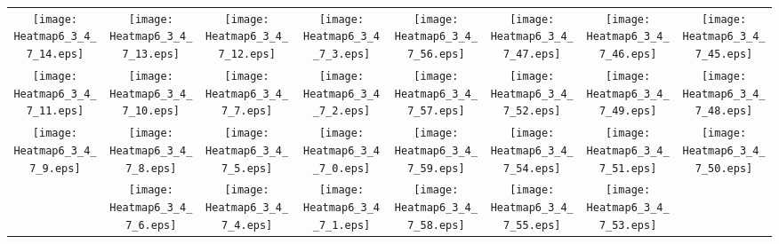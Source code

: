 \documentclass{standalone}
\begin{document}
\begin{tabular}{ *8{c} }
\texttt{[image: Heatmap6\_3\_4\_7\_14.eps]} & \texttt{[image: Heatmap6\_3\_4\_7\_13.eps]} & \texttt{[image: Heatmap6\_3\_4\_7\_12.eps]} & \texttt{[image: Heatmap6\_3\_4\_7\_3.eps]} & \texttt{[image: Heatmap6\_3\_4\_7\_56.eps]} & \texttt{[image: Heatmap6\_3\_4\_7\_47.eps]} & \texttt{[image: Heatmap6\_3\_4\_7\_46.eps]} & \texttt{[image: Heatmap6\_3\_4\_7\_45.eps]} \\
\texttt{[image: Heatmap6\_3\_4\_7\_11.eps]} & \texttt{[image: Heatmap6\_3\_4\_7\_10.eps]} & \texttt{[image: Heatmap6\_3\_4\_7\_7.eps]} & \texttt{[image: Heatmap6\_3\_4\_7\_2.eps]} & \texttt{[image: Heatmap6\_3\_4\_7\_57.eps]} & \texttt{[image: Heatmap6\_3\_4\_7\_52.eps]} & \texttt{[image: Heatmap6\_3\_4\_7\_49.eps]} & \texttt{[image: Heatmap6\_3\_4\_7\_48.eps]} \\
\texttt{[image: Heatmap6\_3\_4\_7\_9.eps]} & \texttt{[image: Heatmap6\_3\_4\_7\_8.eps]} & \texttt{[image: Heatmap6\_3\_4\_7\_5.eps]} & \texttt{[image: Heatmap6\_3\_4\_7\_0.eps]} & \texttt{[image: Heatmap6\_3\_4\_7\_59.eps]} & \texttt{[image: Heatmap6\_3\_4\_7\_54.eps]} & \texttt{[image: Heatmap6\_3\_4\_7\_51.eps]} & \texttt{[image: Heatmap6\_3\_4\_7\_50.eps]} \\
 & \texttt{[image: Heatmap6\_3\_4\_7\_6.eps]} & \texttt{[image: Heatmap6\_3\_4\_7\_4.eps]} & \texttt{[image: Heatmap6\_3\_4\_7\_1.eps]} & \texttt{[image: Heatmap6\_3\_4\_7\_58.eps]} & \texttt{[image: Heatmap6\_3\_4\_7\_55.eps]} & \texttt{[image: Heatmap6\_3\_4\_7\_53.eps]} &  
\end{tabular}
\end{document}
